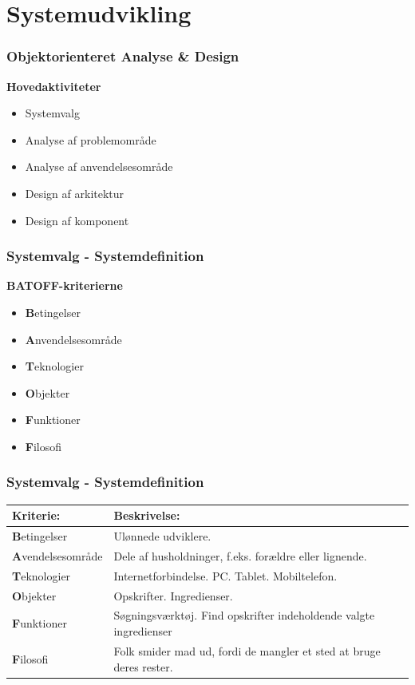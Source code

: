 \section{Systemudvikling}
	\begin{frame}
		\frametitle{Objektorienteret Analyse \& Design}
		\textbf{Hovedaktiviteter}
			\begin{itemize}
				\item Systemvalg
				\item Analyse af problemområde
				\item Analyse af anvendelsesområde
				\item Design af arkitektur
				\item Design af komponent
			\end{itemize}
	\end{frame}
	
	\begin{frame}
		\frametitle{Systemvalg - Systemdefinition}
			\textbf{BATOFF-kriterierne}
				\begin{itemize}
				\item  \textbf{B}etingelser
				\item  \textbf{A}nvendelsesområde
				\item  \textbf{T}eknologier
				\item  \textbf{O}bjekter
				\item  \textbf{F}unktioner
				\item  \textbf{F}ilosofi
				\end{itemize}
	\end{frame}
		
	\begin{frame}
		\frametitle{Systemvalg - Systemdefinition}
		\begin{center}
    		\begin{tabular}{ | l | p{5cm} |} \hline
   				\textbf{Kriterie:} & \bf{Beskrivelse:} \\ \hline
    			\textbf{B}etingelser & Ulønnede udviklere. \\ \hline
    			\textbf{A}vendelsesområde & Dele af husholdninger, f.eks. forældre eller lignende. \\ \hline
    			\textbf{T}eknologier & Internetforbindelse. PC. Tablet. Mobiltelefon. \\ \hline
    			\textbf{O}bjekter & Opskrifter. Ingredienser. \\ \hline
    			\textbf{F}unktioner & Søgningsværktøj. Find opskrifter indeholdende valgte ingredienser \\ \hline
    			\textbf{F}ilosofi & Folk smider mad ud, fordi de mangler et sted at bruge deres rester. \\ \hline
    		\end{tabular}
		\end{center}
	\end{frame}
	
